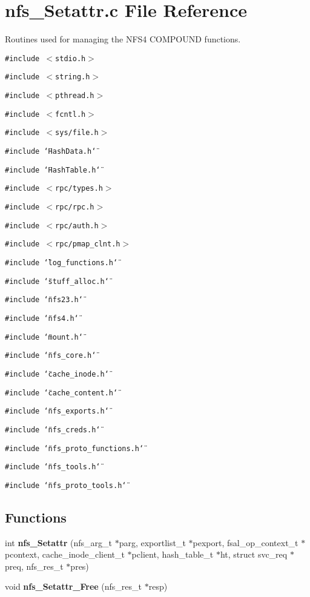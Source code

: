 \section{nfs\_\-Setattr.c File Reference}
\label{nfs__Setattr_8c}
Routines used for managing the NFS4 COMPOUND functions. 

{\tt \#include $<$stdio.h$>$}\par
{\tt \#include $<$string.h$>$}\par
{\tt \#include $<$pthread.h$>$}\par
{\tt \#include $<$fcntl.h$>$}\par
{\tt \#include $<$sys/file.h$>$}\par
{\tt \#include \char`\"{}Hash\-Data.h\char`\"{}}\par
{\tt \#include \char`\"{}Hash\-Table.h\char`\"{}}\par
{\tt \#include $<$rpc/types.h$>$}\par
{\tt \#include $<$rpc/rpc.h$>$}\par
{\tt \#include $<$rpc/auth.h$>$}\par
{\tt \#include $<$rpc/pmap\_\-clnt.h$>$}\par
{\tt \#include \char`\"{}log\_\-functions.h\char`\"{}}\par
{\tt \#include \char`\"{}stuff\_\-alloc.h\char`\"{}}\par
{\tt \#include \char`\"{}nfs23.h\char`\"{}}\par
{\tt \#include \char`\"{}nfs4.h\char`\"{}}\par
{\tt \#include \char`\"{}mount.h\char`\"{}}\par
{\tt \#include \char`\"{}nfs\_\-core.h\char`\"{}}\par
{\tt \#include \char`\"{}cache\_\-inode.h\char`\"{}}\par
{\tt \#include \char`\"{}cache\_\-content.h\char`\"{}}\par
{\tt \#include \char`\"{}nfs\_\-exports.h\char`\"{}}\par
{\tt \#include \char`\"{}nfs\_\-creds.h\char`\"{}}\par
{\tt \#include \char`\"{}nfs\_\-proto\_\-functions.h\char`\"{}}\par
{\tt \#include \char`\"{}nfs\_\-tools.h\char`\"{}}\par
{\tt \#include \char`\"{}nfs\_\-proto\_\-tools.h\char`\"{}}\par
\subsection*{Functions}
\begin{CompactItemize}
\item 
int {\bf nfs\_\-Setattr} (nfs\_\-arg\_\-t $\ast$parg, exportlist\_\-t $\ast$pexport, fsal\_\-op\_\-context\_\-t $\ast$pcontext, cache\_\-inode\_\-client\_\-t $\ast$pclient, hash\_\-table\_\-t $\ast$ht, struct svc\_\-req $\ast$preq, nfs\_\-res\_\-t $\ast$pres)
\item 
void {\bf nfs\_\-Setattr\_\-Free} (nfs\_\-res\_\-t $\ast$resp)
\end{CompactItemize}



